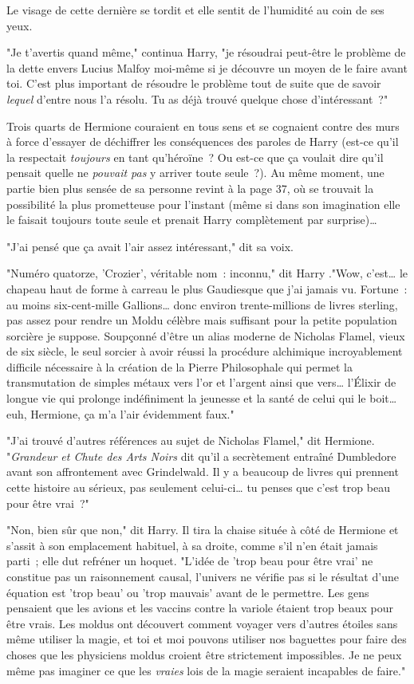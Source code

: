 Le visage de cette dernière se tordit et elle sentit de l'humidité au coin de ses yeux.

"Je t'avertis quand même," continua Harry, "je résoudrai peut-être le problème de la dette envers Lucius Malfoy moi-même si je découvre un moyen de le faire avant toi. C'est plus important de résoudre le problème tout de suite que de savoir \emph{lequel} d'entre nous l'a résolu. Tu as déjà trouvé quelque chose d'intéressant~?"

Trois quarts de Hermione couraient en tous sens et se cognaient contre des murs à force d'essayer de déchiffrer les conséquences des paroles de Harry (est-ce qu'il la respectait \emph{toujours} en tant qu'héroïne~? Ou est-ce que ça voulait dire qu'il pensait quelle ne \emph{pouvait pas} y arriver toute seule~?). Au même moment, une partie bien plus sensée de sa personne revint à la page 37, où se trouvait la possibilité la plus prometteuse pour l'instant (même si dans son imagination elle le faisait toujours toute seule et prenait Harry complètement par surprise)…

"J'ai pensé que ça avait l'air assez intéressant," dit sa voix.

"Numéro quatorze, 'Crozier', véritable nom~: inconnu," dit Harry ."Wow, c'est… le chapeau haut de forme à carreau le plus Gaudiesque que j'ai jamais vu. Fortune~: au moins six-cent-mille Gallions… donc environ trente-millions de livres sterling, pas assez pour rendre un Moldu célèbre mais suffisant pour la petite population sorcière je suppose. Soupçonné d'être un alias moderne de Nicholas Flamel, vieux de six siècle, le seul sorcier à avoir réussi la procédure alchimique incroyablement difficile nécessaire à la création de la Pierre Philosophale qui permet la transmutation de simples métaux vers l'or et l'argent ainsi que vers… l'Élixir de longue vie qui prolonge indéfiniment la jeunesse et la santé de celui qui le boit… euh, Hermione, ça m'a l'air évidemment faux."

"J'ai trouvé d'autres références au sujet de Nicholas Flamel," dit Hermione. "\emph{Grandeur et Chute des Arts Noirs} dit qu'il a secrètement entraîné Dumbledore avant son affrontement avec Grindelwald. Il y a beaucoup de livres qui prennent cette histoire au sérieux, pas seulement celui-ci… tu penses que c'est trop beau pour être vrai~?"

"Non, bien sûr que non," dit Harry. Il tira la chaise située à côté de Hermione et s'assit à son emplacement habituel, à sa droite, comme s'il n'en était jamais parti~; elle dut refréner un hoquet. "L'idée de 'trop beau pour être vrai' ne constitue pas un raisonnement causal, l'univers ne vérifie pas si le résultat d'une équation est 'trop beau' ou 'trop mauvais' avant de le permettre. Les gens pensaient que les avions et les vaccins contre la variole étaient trop beaux pour être vrais. Les moldus ont découvert comment voyager vers d'autres étoiles sans même utiliser la magie, et toi et moi pouvons utiliser nos baguettes pour faire des choses que les physiciens moldus croient être strictement impossibles. Je ne peux même pas imaginer ce que les \emph{vraies} lois de la magie seraient incapables de faire."

